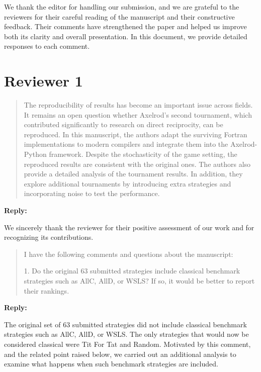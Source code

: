 \documentclass[11pt]{article}
\newcommand{\reply}{
\vspace{0.25em}
{\color{ForestGreen}\textbf{Reply:}}
}
\newenvironment{reviewercomment}
{
\vspace{0.5em}
\begin{quote}
\color{NavyBlue}
}
{
\end{quote}
}
\begin{document}
We thank the editor for handling our submission, and we are grateful to the
reviewers for their careful reading of the manuscript and their constructive
feedback. Their comments have strengthened the paper and helped us improve both
its clarity and overall presentation. In this document, we provide detailed
responses to each comment.


\section*{Reviewer 1}

\begin{reviewercomment}
The reproducibility of results has become an important issue across fields. It
remains an open question whether Axelrod's second tournament, which contributed
significantly to research on direct reciprocity, can be reproduced. In this
manuscript, the authors adapt the surviving Fortran implementations to modern
compilers and integrate them into the Axelrod-Python framework. Despite the
stochasticity of the game setting, the reproduced results are consistent with
the original ones. The authors also provide a detailed analysis of the
tournament results. In addition, they explore additional tournaments by
introducing extra strategies and incorporating noise to test the performance.
\end{reviewercomment}

\reply

We sincerely thank the reviewer for their positive assessment of our work and
for recognizing its contributions.

\begin{reviewercomment}
I have the following comments and questions about the manuscript:

1. Do the original 63 submitted strategies include classical benchmark
strategies such as AllC, AllD, or WSLS? If so, it would be better to report
their rankings.
\end{reviewercomment}

\reply

The original set of 63 submitted
strategies did not include classical benchmark strategies such as AllC, AllD,
or WSLS. The only strategies that would now be considered classical were Tit
For Tat and Random. Motivated by this comment, and the related point raised
below, we carried out an additional analysis to examine what happens when such
benchmark strategies are included.
\end{document}

